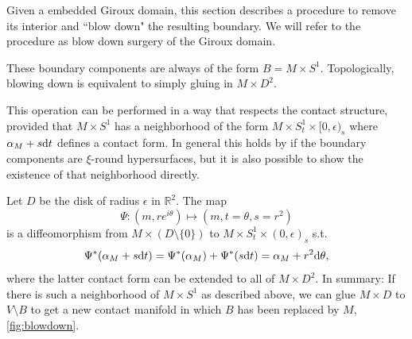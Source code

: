 Given a embedded Giroux domain, this section describes a procedure
to remove its interior and ``blow down" the resulting boundary.
We will refer to the procedure as blow down surgery of the Giroux domain.

These boundary components are always of the form $B = M \times S^1$.
Topologically, blowing down is equivalent to simply gluing in $M\times D^2$.

This operation can be performed in a way that respects the contact structure,
provided that $M \times S^1$ has a neighborhood
of the form $M \times S^1_t \times [0, \epsilon)_s$ where $\alpha_M + s \mathrm{d} t$
defines a contact form.
In general this holds by \cite[Lemma 5.1]{MNW13} if the boundary components 
are $\xi$-round hypersurfaces, but it is also possible to show the existence 
of that neighborhood directly.

Let $D$ be the disk of radius $\epsilon$ in $\mathbb R^2$. The map 
\[
    \Psi \colon (m, re^{i\theta}) \mapsto (m, t = \theta, s = r^2)
\]
is a diffeomorphism from $M \times (D \setminus \{0\})$ to 
$M \times S^1_t \times (0, \epsilon)_s$ s.t.
\[
    \Psi^*(\alpha_M + s \mathrm{d} t) = \Psi^*(\alpha_M) + \Psi^*(s\mathrm{d} t) 
    = \alpha_M + r^2 \mathrm{d} \theta,
\]
where the latter contact form can be extended to all of $M \times D^2$.
In summary: If there is such a neighborhood of $M \times S^1$ as described above, 
we can glue $M \times D$ to $V \setminus B$ to get a new contact manifold 
in which $B$ has been replaced by $M$, \cref{fig:blowdown}.

